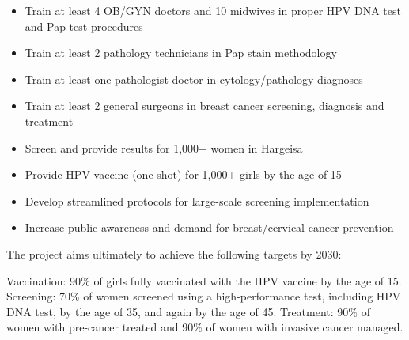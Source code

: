 \documentclass{article}
\begin{document}
\begin{itemize}
\item Train at least 4 OB/GYN doctors and 10 midwives in proper HPV DNA test and Pap test procedures
\item Train at least 2 pathology technicians in Pap stain methodology
\item Train at least one pathologist doctor in cytology/pathology diagnoses
\item Train at least 2 general surgeons in breast cancer screening, diagnosis and treatment

\item Screen and provide results for 1,000+ women in Hargeisa
\item Provide HPV vaccine (one shot) for 1,000+ girls by the age of 15

\item Develop streamlined protocols for large-scale screening implementation
\item Increase public awareness and demand for breast/cervical cancer prevention
\end{itemize}


The project aims ultimately to achieve the following targets by 2030: 
\begin{outline} 
\1 Vaccination: 90\% of girls fully vaccinated with the HPV vaccine by the age of 15. 
\1 Screening: 70\% of women screened using a high-performance test, including HPV DNA test, by the age of 35, and again by the age of 45. 
\1 Treatment: 90\% of women with pre-cancer treated and 90\% of women with invasive cancer managed.
\end{outline}


%
\end{document}
